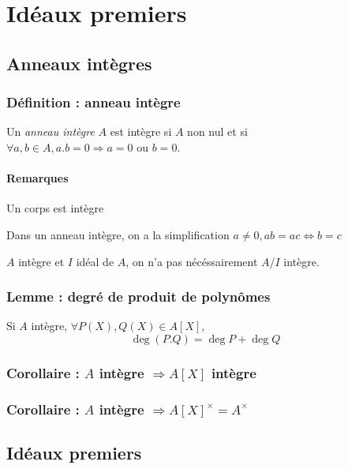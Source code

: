 \documentclass[reqno,a4paper,10pt]{report}
\makeatletter
\newcommand{\soo}{\Longrightarrow}
\let\olditemize=\itemize%
\renewenvironment{itemize}{%
    \olditemize%
  }{%
    \@noparlisttrue%
    \endlist%
  }%
\makeatother
\begin{document}
\section{Idéaux premiers}
\subsection{Anneaux intègres}
\subsubsection{Définition : anneau intègre}
Un \emph{anneau intègre} $A$ est intègre si $A$ non nul et si\\
$\forall a,b \in A, a.b = 0 \soo a=0$ ou $b=0$.

\paragraph{Remarques}
\begin{itemize}
  \item Un corps est intègre
  \item Dans un anneau intègre, on a la simplification $a\neq 0, ab=ac
    \iff b=c$
  \item $A$ intègre et $I$ idéal de $A$, on n'a pas nécéssairement $A/I$
    intègre.
\end{itemize}

\subsubsection{Lemme : degré de produit de polynômes}
Si $A$ intègre, $\forall P(X), Q(X) \in A[X]$,
\[\deg(P.Q) = \deg P + \deg Q\]
\begin{comment}
  Preuve 04/11/09 p1 verso
\end{comment}

\subsubsection{Corollaire : $A$ intègre $\soo A[X]$ intègre}

\subsubsection{Corollaire : $A$ intègre $\soo A[X]^\times = A^\times$}

\subsection{Idéaux premiers}
\end{document}
